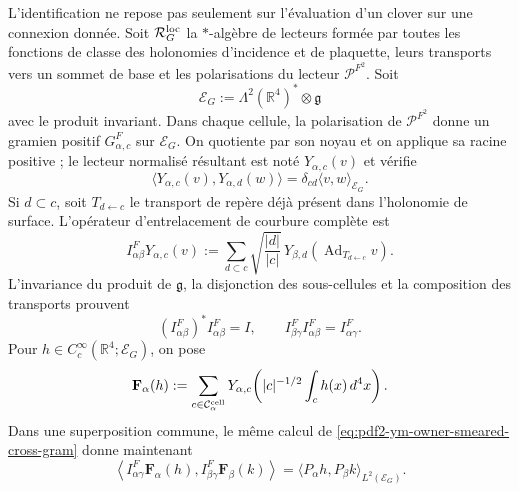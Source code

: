 L’identification ne repose pas seulement sur l’évaluation d’un clover sur une connexion donnée.
Soit $\mathcal R_G^{\rm loc}$ la $*$-algèbre de lecteurs formée par toutes les
fonctions de classe des holonomies d’incidence et de plaquette, leurs transports vers un
sommet de base et les polarisations du lecteur $\mathcal P^{F^2}$. Soit
\begin{equation}\label{eq:pdf2-ym-owner-curvature-fibre}
 \mathcal E_G:=\Lambda^2(\mathbb R^4)^*\otimes\mathfrak g
\end{equation}
avec le produit invariant. Dans chaque cellule, la polarisation de
$\mathcal P^{F^2}$ donne un gramien positif $G_{\alpha,c}^{F}$ sur
$\mathcal E_G$. On quotiente par son noyau et on applique sa racine positive ; le lecteur
normalisé résultant est noté $Y_{\alpha,c}(v)$ et vérifie
\begin{equation}\label{eq:pdf2-ym-owner-curvature-cell-gram}
 \langle Y_{\alpha,c}(v),Y_{\alpha,d}(w)\rangle
 =\delta_{cd}\langle v,w\rangle_{\mathcal E_G}.
\end{equation}
Si $d\subset c$, soit $T_{d\leftarrow c}$ le transport de repère déjà présent dans l'holonomie de surface. L'opérateur d'entrelacement de courbure complète est
\begin{equation}\label{eq:pdf2-ym-owner-curvature-intertwiner}
 I_{\alpha\beta}^{F}Y_{\alpha,c}(v)
 :=\sum_{d\subset c}\sqrt{\frac{|d|}{|c|}}\,
 Y_{\beta,d}\!\left(\operatorname{Ad}_{T_{d\leftarrow c}}v\right).
\end{equation}
L’invariance du produit de $\mathfrak g$, la disjonction des sous-cellules et la
composition des transports prouvent
\begin{equation}\label{eq:pdf2-ym-owner-curvature-intertwiner-identities}
 (I_{\alpha\beta}^{F})^*I_{\alpha\beta}^{F}=I,
 \qquad
 I_{\beta\gamma}^{F}I_{\alpha\beta}^{F}=I_{\alpha\gamma}^{F}.
\end{equation}
Pour $h\in C_c^\infty(\mathbb R^4;\mathcal E_G)$, on pose
\begin{equation}\label{eq:pdf2-ym-owner-f-alpha}
 \mathbf F_\alpha(h):=
 \sum_{c\in\mathcal C_\alpha^{\rm cell}}
 Y_{\alpha,c}\!\left(
   |c|^{-1/2}\int_c h(x)\,d^4x\right).
\end{equation}
Dans une superposition commune, le même calcul de
\eqref{eq:pdf2-ym-owner-smeared-cross-gram} donne maintenant
\begin{equation}\label{eq:pdf2-ym-owner-curvature-cross-gram}
 \left\langle I_{\alpha\gamma}^{F}\mathbf F_\alpha(h),
 I_{\beta\gamma}^{F}\mathbf F_\beta(k)\right\rangle
 =\langle P_\alpha h,P_\beta k\rangle_{L^2(\mathcal E_G)}.
\end{equation}
